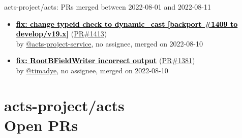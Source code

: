 \begin{frame}[allowframebreaks]{ acts-project/acts: PRs merged 
between 2022-08-01 and 2022-08-11
}
\begin{itemize}
    \item\prmerged
    \hspace*{0.1em}
    \textbf{\href{https://github.com/acts-project/acts/pull/1413}{\textcolor{black}{fix: change typeid check to dynamic\_cast [backport \#1409 to develop/v19.x]}}}
    (\href{https://github.com/acts-project/acts/pull/1413}{PR\#1413}) \\
    by \href{https://github.com/acts-project-service}{@acts-project-service}, {}no assignee, merged on 2022-08-10

    \item\prmerged
    \hspace*{0.1em}
    \textbf{\href{https://github.com/acts-project/acts/pull/1381}{\textcolor{black}{fix: RootBFieldWriter incorrect output}}}
    (\href{https://github.com/acts-project/acts/pull/1381}{PR\#1381}) \\
    by \href{https://github.com/timadye}{@timadye}, {}no assignee, merged on 2022-08-10

  \end{itemize}

\end{frame}



\section{ acts-project/acts \\ Open PRs}

